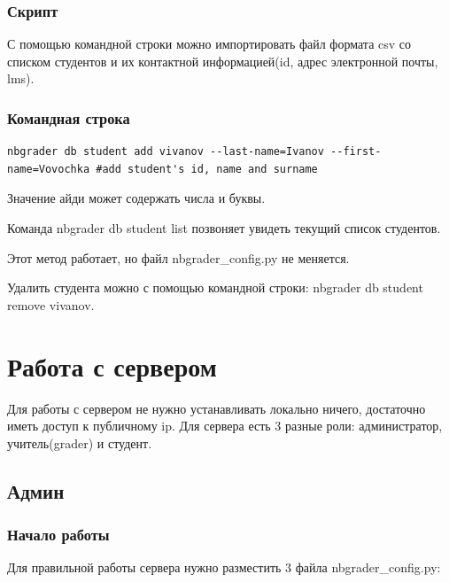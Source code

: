 \documentclass[a4paper,12pt]{article}
\begin{document}
\subsubsection{Скрипт}

С помощью командной строки можно импортировать файл формата csv со списком студентов и их контактной информацией(id, адрес электронной почты, lms).
\subsubsection{Командная строка}

\begin{verbatim} 
nbgrader db student add vivanov --last-name=Ivanov --first-name=Vovochka #add student's id, name and surname
\end{verbatim}
Значение айди может содержать числа и буквы.

Команда nbgrader db student list позвоняет увидеть текущий список студентов.

Этот метод работает, но файл nbgrader\_config.py не меняется.

Удалить студента можно с помощью командной строки: nbgrader db student remove vivanov.
\section{Работа с сервером}

Для работы с сервером не нужно устанавливать локально ничего, достаточно иметь доступ к публичному ip. Для сервера есть 3 разные роли: администратор, учитель(grader) и студент.

\subsection{Админ}
\subsubsection{Начало работы}
Для правильной работы сервера нужно разместить 3 файла nbgrader\_config.py:
\end{document}
